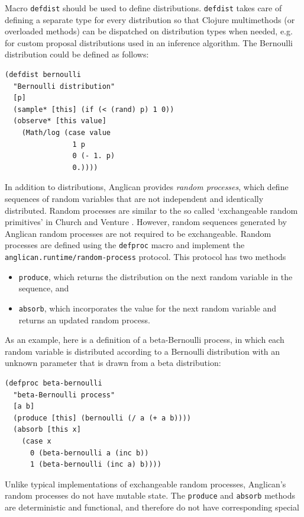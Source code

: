 \documentclass[preprint]{sigplanconf}
\begin{document}
Macro \texttt{defdist} should be used to define distributions.
\texttt{defdist} takes care of defining a separate type
for every distribution so that Clojure multimethods (or overloaded
methods) can be dispatched on
distribution types when needed, e.g. for custom proposal distributions 
used in an inference algorithm. The
Bernoulli distribution could be defined as follows:
\begin{lstlisting}[style=default]
(defdist bernoulli
  "Bernoulli distribution"
  [p]
  (sample* [this] (if (< (rand) p) 1 0))
  (observe* [this value]
    (Math/log (case value
                1 p
                0 (- 1. p)
                0.))))
\end{lstlisting}

In addition to distributions, Anglican provides \textit{random processes},
which define sequences of random variables that are not independent and
identically distributed. Random processes are similar to the so called
`exchangeable random primitives' in Church \cite{GMR+08} and
Venture \cite{MSP14}. However, random sequences generated by Anglican random 
processes are not required to be exchangeable. Random processes are
defined using the \texttt{defproc} macro and implement the
\texttt{anglican.runtime/{\linebreak[0]}random-process} protocol. This
protocol has two methods
\begin{itemize}
\item \texttt{produce}, which returns the distribution on the next
random variable in the sequence, and
\item \texttt{absorb}, which incorporates the value for the next random
variable and returns an updated random process.
\end{itemize}
 As an example, here is a definition of a beta-Bernoulli process, in which
each random variable is distributed according to a Bernoulli distribution with
an unknown parameter that is drawn from a beta distribution:
\begin{lstlisting}[style=default]
(defproc beta-bernoulli
  "beta-Bernoulli process"
  [a b]
  (produce [this] (bernoulli (/ a (+ a b))))
  (absorb [this x]
    (case x
      0 (beta-bernoulli a (inc b))
      1 (beta-bernoulli (inc a) b))))
\end{lstlisting}
Unlike typical implementations of exchangeable random processes,
Anglican's random processes do not have mutable state. The
\texttt{produce} and \texttt{absorb} methods are deterministic
and functional, and therefore do not have corresponding special
\end{document}
